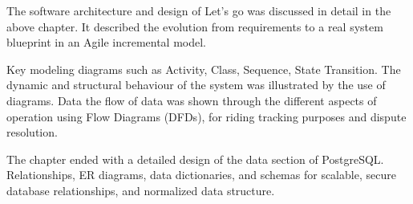 The software architecture and design of Let's go was discussed in detail in the above chapter. It described the evolution from requirements to a real system blueprint in an Agile incremental model. 

Key modeling diagrams such as Activity, Class, Sequence, State Transition. The dynamic and structural behaviour of the system was illustrated by the use of diagrams. Data the flow of data was shown through the different aspects of operation using Flow Diagrams (DFDs), for riding tracking purposes and dispute resolution.

The chapter ended with a detailed design of the data section of PostgreSQL. Relationships, ER diagrams, data dictionaries, and schemas for scalable, secure database relationships, and normalized data structure.